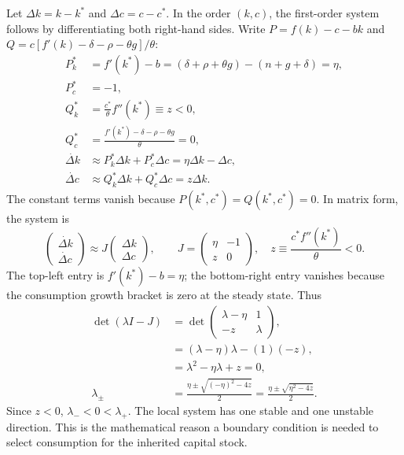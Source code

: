 Let $\Delta k=k-k^*$ and $\Delta c=c-c^*$. In the order $(k,c)$, the first-order
system follows by differentiating both right-hand sides. Write
$P=f(k)-c-bk$ and $Q=c[f'(k)-\delta-\rho-\theta g]/\theta$:
\begin{align}
P_k^*&=f'(k^*)-b
 =(\delta+\rho+\theta g)-(n+g+\delta)=\eta,\\
P_c^*&=-1,\\
Q_k^*&=\frac{c^*}{\theta}f''(k^*)\equiv z<0,\\
Q_c^*&=\frac{f'(k^*)-\delta-\rho-\theta g}{\theta}=0,\\
\dot{\Delta k}&\approx P_k^*\Delta k+P_c^*\Delta c
                 =\eta\Delta k-\Delta c,\\
\dot{\Delta c}&\approx Q_k^*\Delta k+Q_c^*\Delta c=z\Delta k.
\end{align}
The constant terms vanish because $P(k^*,c^*)=Q(k^*,c^*)=0$.
In matrix form, the system is
\begin{equation}\label{eq:ramsey-jacobian}
\begin{pmatrix}\dot{\Delta k}\\\dot{\Delta c}\end{pmatrix}
\approx
J\begin{pmatrix}\Delta k\\\Delta c\end{pmatrix},\qquad
J=\begin{pmatrix}\eta&-1\\ z&0\end{pmatrix},\quad
z\equiv\frac{c^*f''(k^*)}{\theta}<0.
\end{equation}
The top-left entry is $f'(k^*)-b=\eta$; the bottom-right entry vanishes because
the consumption growth bracket is zero at the steady state. Thus
\begin{align}
\det(\lambda I-J)
 &=\det\begin{pmatrix}\lambda-\eta&1\\-z&\lambda\end{pmatrix},\\
 &=(\lambda-\eta)\lambda-(1)(-z),\\
 &=\lambda^2-\eta\lambda+z=0,\\
\lambda_{\pm}&=\frac{\eta\pm\sqrt{(-\eta)^2-4z}}{2}
              =\frac{\eta\pm\sqrt{\eta^2-4z}}{2}.
\end{align}
Since $z<0$, $\lambda_-<0<\lambda_+$. The local system has one stable and one
unstable direction. This is the mathematical reason a boundary condition is
needed to select consumption for the inherited capital stock.

